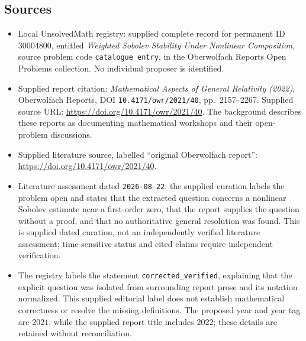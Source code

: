\documentclass[11pt]{article}
\begin{document}
\subsection{Sources}
\begin{itemize}
\item Local UnsolvedMath registry: supplied complete record for permanent ID \(30004800\), entitled \emph{Weighted Sobolev Stability Under Nonlinear Composition}, source problem code \texttt{catalogue entry}, in the Oberwolfach Reports Open Problems collection. No individual proposer is identified.
\item Supplied report citation: \emph{Mathematical Aspects of General Relativity (2022)}, Oberwolfach Reports, DOI \texttt{10.4171/owr/2021/40}, pp.\ 2157--2267. Supplied source URL: \url{https://doi.org/10.4171/owr/2021/40}. The background describes these reports as documenting mathematical workshops and their open-problem discussions.
\item Supplied literature source, labelled ``original Oberwolfach report'': \url{https://doi.org/10.4171/owr/2021/40}.
\item Literature assessment dated \texttt{2026-08-22}: the supplied curation labels the problem open and states that the extracted question concerns a nonlinear Sobolev estimate near a first-order zero, that the report supplies the question without a proof, and that no authoritative general resolution was found. This is supplied dated curation, not an independently verified literature assessment; time-sensitive status and cited claims require independent verification.
\item The registry labels the statement \texttt{corrected\_verified}, explaining that the explicit question was isolated from surrounding report prose and its notation normalized. This supplied editorial label does not establish mathematical correctness or resolve the missing definitions. The proposed year and year tag are \(2021\), while the supplied report title includes \(2022\); these details are retained without reconciliation.
\end{itemize}
\end{document}
